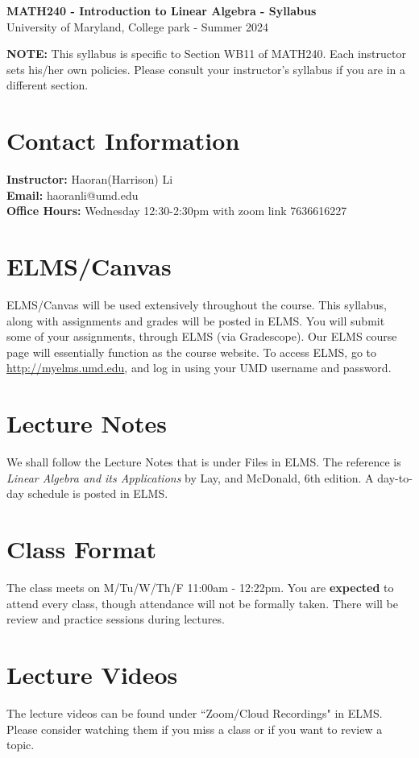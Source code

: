 \documentclass[a4paper,10pt]{article}
\begin{document}
\begin{center}
\large
\textbf{MATH240 - Introduction to Linear Algebra - Syllabus} \\
\vspace{0.5cm}
\normalsize
University of Maryland, College park - Summer 2024\\
\end{center}

\noindent
\textbf{NOTE:} This syllabus is specific to Section WB11 of MATH240. Each instructor sets his/her own policies. Please consult your instructor’s syllabus if you are in a different section.

\section{Contact Information}
\textbf{Instructor:} Haoran(Harrison) Li\\
\textbf{Email:} haoranli@umd.edu\\
\textbf{Office Hours:} Wednesday 12:30-2:30pm with zoom link 7636616227

\section{ELMS/Canvas}
ELMS/Canvas will be used extensively throughout the course. This syllabus, along with assignments and grades will be posted in ELMS. You will submit some of your assignments, through ELMS (via Gradescope). Our ELMS course page will essentially function as the course website. To access ELMS, go to \url{http://myelms.umd.edu}, and log in using your UMD username and password.

\section{Lecture Notes}
We shall follow the Lecture Notes that is under Files in ELMS. The reference is \textit{Linear Algebra and its Applications} by Lay, and McDonald, 6th edition. A day-to-day schedule is posted in ELMS.

\section{Class Format}
The class meets on M/Tu/W/Th/F 11:00am - 12:22pm. You are \textbf{expected} to attend every class, though attendance will not be formally taken. There will be review and practice sessions during lectures.

\section{Lecture Videos}
The lecture videos can be found under ``Zoom/Cloud Recordings" in ELMS. Please consider watching them if you miss a class or if you want to review a topic.
\end{document}
